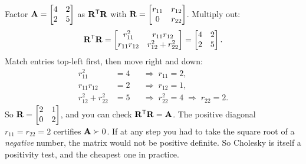 \begin{example}
\label{ch27:ex-cholesky}
Factor $\mathbf{A} = \begin{bmatrix} 4 & 2 \\ 2 & 5 \end{bmatrix}$ as $\mathbf{R}^{\mathsf{T}}\mathbf{R}$ with
$\mathbf{R} = \begin{bmatrix} r_{11} & r_{12} \\ 0 & r_{22} \end{bmatrix}$. Multiply out:
\[
  \mathbf{R}^{\mathsf{T}}\mathbf{R} =
  \begin{bmatrix} r_{11}^2 & r_{11}r_{12} \\ r_{11}r_{12} & r_{12}^2 + r_{22}^2 \end{bmatrix}
  = \begin{bmatrix} 4 & 2 \\ 2 & 5 \end{bmatrix}.
\]
Match entries top-left first, then move right and down:
\begin{align*}
  r_{11}^2 &= 4 &&\Rightarrow\; r_{11} = 2,\\
  r_{11}r_{12} &= 2 &&\Rightarrow\; r_{12} = 1,\\
  r_{12}^2 + r_{22}^2 &= 5 &&\Rightarrow\; r_{22}^2 = 4 \;\Rightarrow\; r_{22}=2.
\end{align*}
So $\mathbf{R} = \begin{bmatrix} 2 & 1 \\ 0 & 2 \end{bmatrix}$, and you can check
$\mathbf{R}^{\mathsf{T}}\mathbf{R} = \mathbf{A}$. The positive diagonal $r_{11}=r_{22}=2$ certifies $\mathbf{A}\succ0$. If at
any step you had to take the square root of a \emph{negative} number, the matrix would not be
positive definite. So Cholesky is itself a positivity test, and the cheapest one in practice.
\end{example}

